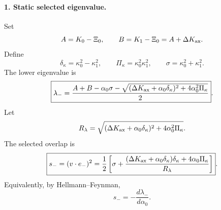 \paragraph{1. Static selected eigenvalue.}
Set
\begin{equation}
\label{eq:app-stage030-AB}
A=K_0-\Xi_0,
\qquad
B=K_1-\Xi_0=A+\Delta K_{\rm ax}.
\end{equation}
Define
\begin{equation}
\delta_\kappa=\kappa_0^2-\kappa_1^2,
\qquad
\Pi_\kappa=\kappa_0^2\kappa_1^2,
\qquad
\sigma=\kappa_0^2+\kappa_1^2.
\end{equation}
The lower eigenvalue is
\begin{equation}
\label{eq:app-stage030-lambda-minus}
\boxed{
\lambda_-=\frac{A+B-\alpha_0\sigma-
\sqrt{(\Delta K_{\rm ax}+\alpha_0\delta_\kappa)^2+4\alpha_0^2\Pi_\kappa}}{2}}.
\end{equation}
Let
\begin{equation}
R_\lambda=\sqrt{(\Delta K_{\rm ax}+\alpha_0\delta_\kappa)^2+4\alpha_0^2\Pi_\kappa}.
\end{equation}
The selected overlap is
\begin{equation}
\label{eq:app-stage030-s-minus}
\boxed{
s_-=(v\cdot e_-)^2
=\frac12\left[
\sigma+\frac{(\Delta K_{\rm ax}+\alpha_0\delta_\kappa)\delta_\kappa+4\alpha_0\Pi_\kappa}{R_\lambda}
\right]}.
\end{equation}
Equivalently, by Hellmann--Feynman,
\begin{equation}
\label{eq:app-stage030-HF}
\boxed{
s_-=-\frac{d\lambda_-}{d\alpha_0}}.
\end{equation}

